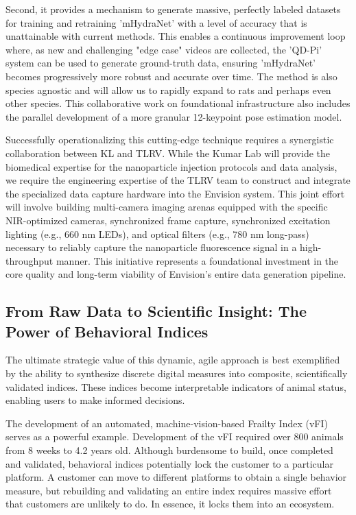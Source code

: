 \documentclass[11pt,onecolumn]{article}
\begin{document}
Second, it provides a mechanism to generate massive, perfectly labeled datasets for training and retraining 'mHydraNet' with a level of accuracy that is unattainable with current methods. This enables a continuous improvement loop where, as new and challenging "edge case" videos are collected, the 'QD-Pi' system can be used to generate ground-truth data, ensuring 'mHydraNet' becomes progressively more robust and accurate over time. The method is also species agnostic and will allow us to rapidly expand to rats and perhaps even other species. This collaborative work on foundational infrastructure also includes the parallel development of a more granular 12-keypoint pose estimation model.

Successfully operationalizing this cutting-edge technique requires a synergistic collaboration between KL and TLRV. While the Kumar Lab will provide the biomedical expertise for the nanoparticle injection protocols and data analysis, we require the engineering expertise of the TLRV team to construct and integrate the specialized data capture hardware into the Envision system. This joint effort will involve building multi-camera imaging arenas equipped with the specific NIR-optimized cameras, synchronized frame capture, synchronized excitation lighting (e.g., 660 nm LEDs), and optical filters (e.g., 780 nm long-pass) necessary to reliably capture the nanoparticle fluorescence signal in a high-throughput manner. This initiative represents a foundational investment in the core quality and long-term viability of Envision's entire data generation pipeline.

\subsection{From Raw Data to Scientific Insight: The Power of Behavioral Indices}

The ultimate strategic value of this dynamic, agile approach is best exemplified by the ability to synthesize discrete digital measures into composite, scientifically validated indices. These indices become interpretable indicators of animal status, enabling users to make informed decisions.

The development of an automated, machine-vision-based Frailty Index (vFI) serves as a powerful example. Development of the vFI required over 800 animals from 8 weeks to 4.2 years old. Although burdensome to build, once completed and validated, behavioral indices potentially lock the customer to a particular platform. A customer can move to different platforms to obtain a single behavior measure, but rebuilding and validating an entire index requires massive effort that customers are unlikely to do. In essence, it locks them into an ecosystem.
\end{document}
